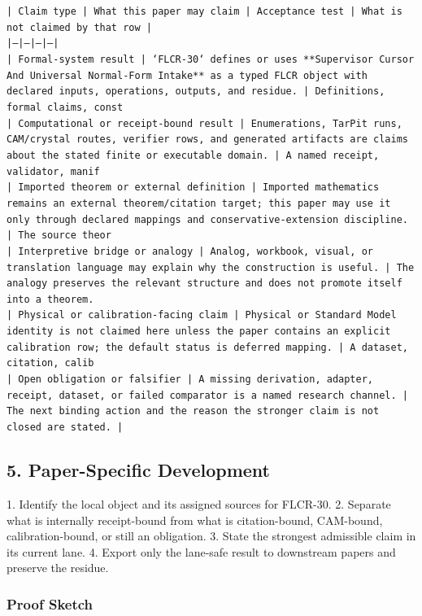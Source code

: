 \documentclass[11pt]{article}
\begin{document}
\noindent\texttt{| Claim type | What this paper may claim | Acceptance test | What is not claimed by that row |}\\
\noindent\texttt{|---|---|---|---|}\\
\noindent\texttt{| Formal-system result | `FLCR-30` defines or uses **Supervisor Cursor And Universal Normal-Form Intake** as a typed FLCR object with declared inputs, operations, outputs, and residue. | Definitions, formal claims, const}\\
\noindent\texttt{| Computational or receipt-bound result | Enumerations, TarPit runs, CAM/crystal routes, verifier rows, and generated artifacts are claims about the stated finite or executable domain. | A named receipt, validator, manif}\\
\noindent\texttt{| Imported theorem or external definition | Imported mathematics remains an external theorem/citation target; this paper may use it only through declared mappings and conservative-extension discipline. | The source theor}\\
\noindent\texttt{| Interpretive bridge or analogy | Analog, workbook, visual, or translation language may explain why the construction is useful. | The analogy preserves the relevant structure and does not promote itself into a theorem. }\\
\noindent\texttt{| Physical or calibration-facing claim | Physical or Standard Model identity is not claimed here unless the paper contains an explicit calibration row; the default status is deferred mapping. | A dataset, citation, calib}\\
\noindent\texttt{| Open obligation or falsifier | A missing derivation, adapter, receipt, dataset, or failed comparator is a named research channel. | The next binding action and the reason the stronger claim is not closed are stated. | }\\

\subsection*{5. Paper-Specific Development}

1. Identify the local object and its assigned sources for FLCR-30.
2. Separate what is internally receipt-bound from what is citation-bound, CAM-bound, calibration-bound, or still an obligation.
3. State the strongest admissible claim in its current lane.
4. Export only the lane-safe result to downstream papers and preserve the residue.

\subsubsection*{Proof Sketch}
\end{document}
